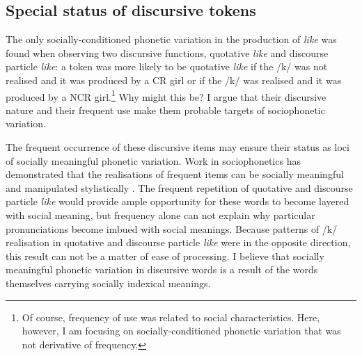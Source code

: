 \subsection{Special status of discursive tokens}\label{sec:statusofdisc}

The only socially-conditioned phonetic variation in the production of \textit{like} was found when observing two discursive functions, quotative \textit{like} and discourse particle \textit{like}: a token was more likely to be quotative \textit{like} if the /k/ was not realised and it was produced by a CR girl or if the /k/ was realised and it was produced by a NCR girl.\footnote{Of course, frequency of use was related to social characteristics. Here, however, I am focusing on socially-conditioned phonetic variation that was not derivative of frequency.} Why might this be? I argue that their discursive nature and their frequent use make them probable targets of sociophonetic variation.

The frequent occurrence of these discursive items may ensure their status as loci of socially meaningful phonetic variation. Work in sociophonetics has demonstrated that the realisations of frequent items can be socially meaningful and manipulated stylistically \citep{oprah1999}. The frequent repetition of quotative and discourse particle \textit{like} would provide ample opportunity for these words to become layered with social meaning, but frequency alone can not explain why particular pronunciations become imbued with social meanings. Because patterns of /k/ realisation in quotative and discourse particle \textit{like} were in the opposite direction, this result can not be a matter of ease of processing. I believe that socially meaningful phonetic variation in discursive words is a result of the words themselves carrying socially indexical meanings.


